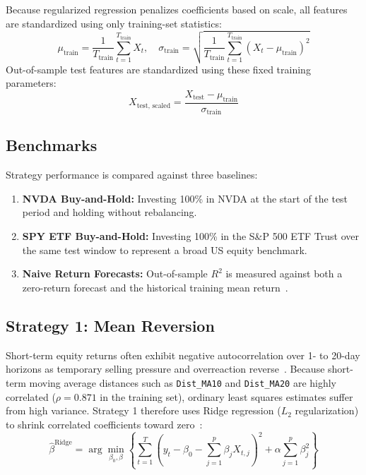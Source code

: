 \documentclass[11pt, a4paper]{article}
\begin{document}
Because regularized regression penalizes coefficients based on scale, all features are standardized using only training-set statistics:
\begin{equation}
\mu_{\text{train}} = \frac{1}{T_{\text{train}}}\sum_{t=1}^{T_{\text{train}}} X_t, \quad \sigma_{\text{train}} = \sqrt{\frac{1}{T_{\text{train}}}\sum_{t=1}^{T_{\text{train}}} (X_t - \mu_{\text{train}})^2}
\end{equation}
Out-of-sample test features are standardized using these fixed training parameters:
\begin{equation}
X_{\text{test, scaled}} = \frac{X_{\text{test}} - \mu_{\text{train}}}{\sigma_{\text{train}}}
\end{equation}

\subsection{Benchmarks}
\label{sec:benchmarks}
Strategy performance is compared against three baselines:
\begin{enumerate}
    \item \textbf{NVDA Buy-and-Hold:} Investing 100\% in NVDA at the start of the test period and holding without rebalancing.
    \item \textbf{SPY ETF Buy-and-Hold:} Investing 100\% in the S\&P 500 ETF Trust over the same test window to represent a broad US equity benchmark.
    \item \textbf{Naive Return Forecasts:} Out-of-sample $R^2$ is measured against both a zero-return forecast and the historical training mean return~\cite{campbell2008}.
\end{enumerate}

\subsection{Strategy 1: Mean Reversion}
\label{sec:s1}

Short-term equity returns often exhibit negative autocorrelation over 1- to 20-day horizons as temporary selling pressure and overreaction reverse~\cite{jegadeesh1990, lehmann1990, lomackinlay1990}. Because short-term moving average distances such as \texttt{Dist\_MA10} and \texttt{Dist\_MA20} are highly correlated ($\rho = 0.871$ in the training set), ordinary least squares estimates suffer from high variance. Strategy 1 therefore uses Ridge regression ($L_2$ regularization) to shrink correlated coefficients toward zero~\cite{hoerl1970}:
\begin{equation}
\hat{\beta}^{\text{Ridge}} = \arg\min_{\beta_0, \beta} \left\{ \sum_{t=1}^{T} \left( y_t - \beta_0 - \sum_{j=1}^{p} \beta_j X_{t,j} \right)^2 + \alpha \sum_{j=1}^{p} \beta_j^2 \right\}
\end{equation}
\end{document}
